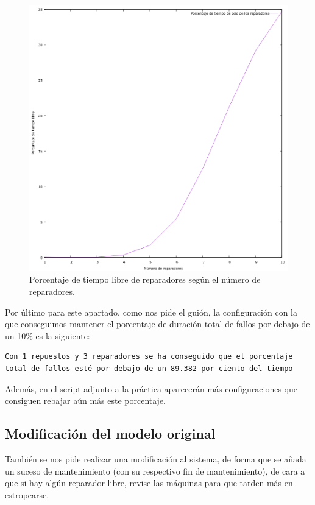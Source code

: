 \documentclass[12pt, spanish]{article}
\begin{document}
\begin{figure}[H]
  \centering
      \includegraphics[width=\textwidth]{tlibre_reparadores.png}
 		\caption{Porcentaje de tiempo libre de reparadores según el número de reparadores.}
\end{figure}



Por último para este apartado, como nos pide el guión, la configuración con la que conseguimos mantener el porcentaje de duración total de fallos por debajo de un 10\% es la siguiente:

\begin{lstlisting}
Con 1 repuestos y 3 reparadores se ha conseguido que el porcentaje total de fallos esté por debajo de un 89.382 por ciento del tiempo
\end{lstlisting}

Además, en el script adjunto a la práctica aparecerán más configuraciones que consiguen rebajar aún más este porcentaje.

\subsection{Modificación del modelo original}

También se nos pide realizar una modificación al sistema, de forma que se añada un suceso de mantenimiento (con su respectivo fin de mantenimiento), de cara a que si hay algún reparador libre, revise las máquinas para que tarden más en estropearse.
\end{document}

